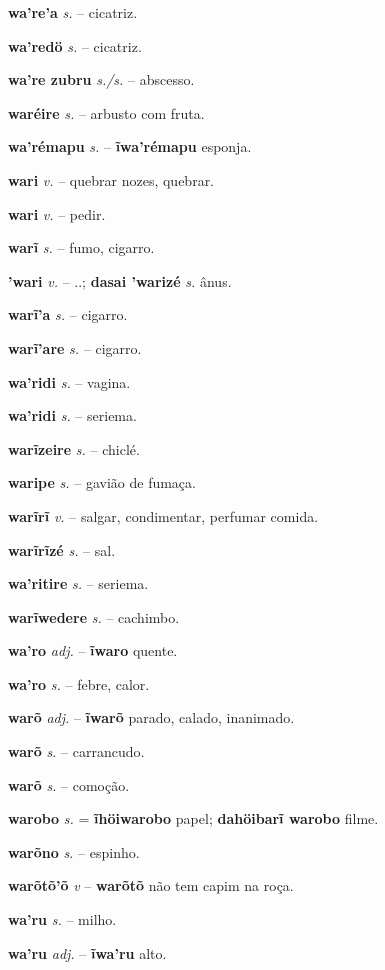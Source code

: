 \textbf{wa're'a} \textit{s.} -- cicatriz.

\textbf{wa'redö} \textit{s.} -- cicatriz.

\textbf{wa're zubru} \textit{s./s.} -- abscesso.

\textbf{waréire} \textit{s.} -- arbusto com fruta.

\textbf{wa'rémapu} \textit{s.} -- \textbf{ĩwa'rémapu} esponja.

\textbf{wari} \textit{v.} -- quebrar nozes, quebrar.

\textbf{wari} \textit{v.} -- pedir.

\textbf{warĩ} \textit{s.} -- fumo, cigarro.

\textbf{'wari} \textit{v.} -- ..; \textbf{dasai 'warizé} \textit{s.} ânus.

\textbf{warĩ'a} \textit{s.} -- cigarro.

\textbf{warĩ'are} \textit{s.} -- cigarro.

\textbf{wa'ridi} \textit{s.} -- vagina.

\textbf{wa'ridi} \textit{s.} -- seriema.

\textbf{warĩzeire} \textit{s.} -- chiclé.

\textbf{waripe} \textit{s.} -- gavião de fumaça.

\textbf{warĩrĩ} \textit{v.} -- salgar, condimentar, perfumar comida.

\textbf{warĩrĩzé} \textit{s.} -- sal.

\textbf{wa'ritire} \textit{s.} -- seriema.

\textbf{warĩwedere} \textit{s.} -- cachimbo.

\textbf{wa'ro} \textit{adj.} -- \textbf{ĩwaro} quente.

\textbf{wa'ro} \textit{s.} -- febre, calor.

\textbf{warõ} \textit{adj.} -- \textbf{ĩwarõ} parado, calado, inanimado.

\textbf{warõ} \textit{s.} -- carrancudo.

\textbf{warõ} \textit{s.} -- comoção.

\textbf{warobo} \textit{s.} = \textbf{ĩhöiwarobo} papel; \textbf{dahöibarĩ warobo} filme.

\textbf{warõno} \textit{s.} -- espinho.

\textbf{warõtõ'õ} \textit{v} -- \textbf{warõtõ} não tem capim na roça.

\textbf{wa'ru} \textit{s.} -- milho.

\textbf{wa'ru} \textit{adj.} -- \textbf{ĩwa'ru} alto.

